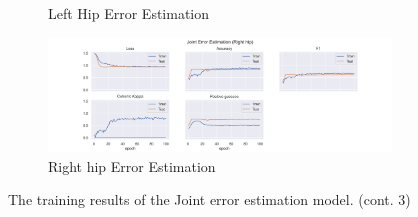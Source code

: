 \begin{figure}
\begin{subfigure}[b]{0.47\linewidth}
      \caption{Left Hip Error Estimation}
      \label{fig:lehi_jt_ee}
  \end{subfigure}
  \hfill
  \begin{subfigure}[b]{0.47\linewidth}
      \centering
      \includegraphics[width=\textwidth]{figures/Results/jt/JointErrorEstimation_Right hip.png}
      \caption{Right hip Error Estimation}
      \label{fig:rihi_jt_ee}
  \end{subfigure}
  \caption[]{The training results of the Joint error estimation model. (cont. 3)}
\end{figure}


